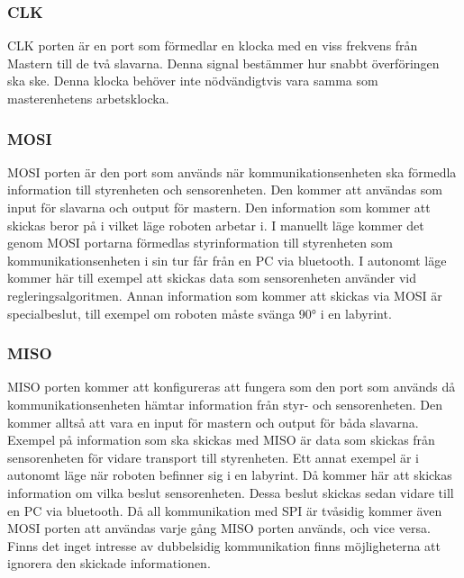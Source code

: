 \subsubsection{CLK}

CLK porten är en port som förmedlar en klocka med en viss frekvens från Mastern till de två slavarna. Denna signal bestämmer hur snabbt överföringen ska ske. Denna klocka behöver inte nödvändigtvis vara samma som masterenhetens arbetsklocka. 

\subsubsection{MOSI}
MOSI porten är den port som används när kommunikationsenheten ska förmedla information till styrenheten och sensorenheten. Den kommer att användas som input för slavarna och output för mastern. Den information som kommer att skickas beror på i vilket läge roboten arbetar i. I manuellt läge kommer det genom MOSI portarna förmedlas styrinformation till styrenheten som kommunikationsenheten i sin tur får från en PC via bluetooth. I autonomt läge kommer här till exempel att skickas data som sensorenheten använder vid regleringsalgoritmen. Annan information som kommer att skickas via MOSI är specialbeslut, till exempel om roboten måste svänga 90° i en labyrint.

\subsubsection{MISO}
MISO porten kommer att konfigureras att fungera som den port som används då kommunikationsenheten hämtar information från styr- och sensorenheten. Den kommer alltså att vara en input för mastern och output för båda slavarna. Exempel på information som ska skickas med MISO är data som skickas från sensorenheten för vidare transport till styrenheten. Ett annat exempel är i autonomt läge när roboten befinner sig i en labyrint. Då kommer här att skickas information om vilka beslut sensorenheten. Dessa beslut skickas sedan vidare till en PC via bluetooth.
Då all kommunikation med SPI är tvåsidig kommer även MOSI porten att användas varje gång MISO porten används, och vice versa. Finns det inget intresse av dubbelsidig kommunikation finns möjligheterna att ignorera den skickade informationen.

